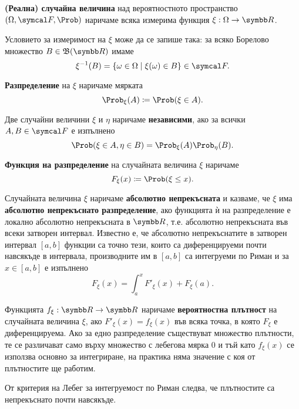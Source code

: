 \documentclass[numbers=endperiod, bibliography=totocnumbered]{scrartcl}
\begin{document}
\begin{definition}
  \textbf{(Реална) случайна величина} над вероятностното пространство \( (\Omega, \F, \Prob) \) наричаме всяка измерима функция \( \xi : \Omega \to \R \).

  Условието за измеримост на \( \xi \) може да се запише така: за всяко Борелово множество \( B \in \BorelAlgebra(\R) \) имаме
  \begin{equation*}
    \xi^{-1} (B) = \{ \omega \in \Omega \mid \xi(\omega) \in B \} \in \F.
  \end{equation*}

  \textbf{Разпределение} на \( \xi \) наричаме мярката
  \begin{equation*}
    \Prob_\xi(A) \coloneqq \Prob(\xi \in A).
  \end{equation*}

  Две случайни величини \( \xi \) и \( \eta \) наричаме \textbf{независими}, ако за всички \( A, B \in \F \) е изпълнено
  \begin{equation*}
    \Prob(\xi \in A, \eta \in B) = \Prob_\xi(A) \Prob_\eta(B).
  \end{equation*}

  \textbf{Функция на разпределение} на случайната величина \( \xi \) наричаме
  \begin{equation*}
    F_\xi(x) \coloneqq \Prob(\xi \leq x).
  \end{equation*}

  Случайната величина \( \xi \) наричаме \textbf{абсолютно непрекъсната} и казваме, че \( \xi \) има \textbf{абсолютно непрекъснато разпределение}, ако функцията ѝ на разпределение е локално абсолютно непрекъсната в \( \R \), т.е. абсолютно непрекъсната във всеки затворен интервал. Известно е, че абсолютно непрекъснатите в затворен интервал \( [a, b] \) функции са точно тези, които са диференцируеми почти навсякъде в интервала, производните им в \( [a, b] \) са интегруеми по Риман и за \( x \in [a, b] \) е изпълнено
  \begin{equation*}
    F_\xi(x) = \int_a^x F'_\xi(x) + F_\xi(a).
  \end{equation*}

  Функцията \( f_\xi: \R \to \R \) наричаме \textbf{вероятностна плътност} на случайната величина \( \xi \), ако \( F'_\xi(x) = f_\xi(x) \) във всяка точка, в която \( F_\xi \) е диференцируема. Ако за едно разпределение съществуват множество плътности, те се различават само върху множество с лебегова мярка 0 и тъй като \( f_\xi(x) \) се използва основно за интегриране, на практика няма значение с коя от плътностите ще работим.

  От критерия на Лебег за интегруемост по Риман следва, че плътностите са непрекъснато почти навсякъде.
\end{definition}
\end{document}

